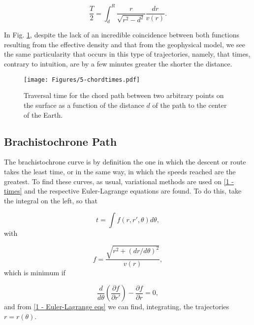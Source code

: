\documentclass[aps,twocolumn,showpacs,preprintnumbers]{revtex4}
\begin{document}
        \begin{equation}
            \frac{T}{2} =  \int_{d}^{R} \frac{r}{\sqrt{r^2 -d^2}} \frac{dr}{v(r)}.
            \label{1 - Times for chord path}
        \end{equation}
        
        In Fig. \ref{fig: 1-times}, despite the lack of an incredible coincidence between both functions resulting from the effective density and that from the geophysical model, we see the same particularity that occurs in this type of trajectories, namely, that times, contrary to intuition, are by a few minutes greater the shorter the distance.
            
        \begin{figure}
            \centering
             \texttt{[image: Figures/5-chordtimes.pdf]}
            \caption{Traversal time for the chord path between two arbitrary points on the surface as a function of the distance $d$ of the path to the center of the Earth.}
            \label{fig: 1-times}
        \end{figure}
            
            
    \subsection{Brachistochrone Path}\label{braquistochrone section}
        
    The brachistochrone curve is by definition the one in which the descent or route takes the least time, or in the same way, in which the speeds reached are the greatest. To find these curves, as usual, variational methods are used on \eqref{1 - times} and the respective Euler-Lagrange equations are found. To do this, take the integral on the left, so that
    
    \begin{equation*}
        t = \int f(r, r', \theta) d\theta,
    \end{equation*}
    with
            
    \begin{equation}
        f= \frac{\sqrt{r^2 + (dr / d\theta )^2 } }{v(r)}, 
        \label{1 - effective lagrangian}
    \end{equation}
    which is minimum if 
    
    \begin{equation}
       \frac{d}{d \theta } \left( \frac{\partial f}{\partial r'} \right)  - \frac{\partial f}{\partial r} = 0 ,
       \label{1 - Euler-Lagrange eqs}
    \end{equation}
    and from \eqref{1 - Euler-Lagrange eqs} we can find, integrating, the trajectories $ r = r (\theta) $. 
    
\end{document}
